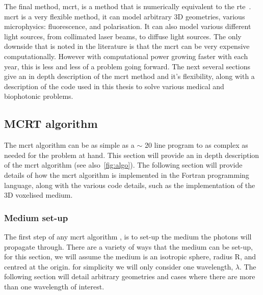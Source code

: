 \medskip

The final method, \gls{mcrt}, is a method that is numerically equivalent to the \gls{rte}~\cite{wang2012biomedical}. \Gls{mcrt} is a very flexible method, it can model arbitrary 3D geometries, various microphysics: fluorescence, and polarisation. It can also model various different light sources, from collimated laser beams, to diffuse light sources. The only downside that is noted in the literature is that the \gls{mcrt} can be very expensive computationally. However with computational power growing faster with each year, this is less and less of a problem going forward. The next several sections give an in depth description of the \gls{mcrt} method and it's flexibility, along with a description of the code used in this thesis to solve various medical and biophotonic problems.

\subsection{MCRT algorithm}

The \gls{mcrt} algorithm can be as simple as a $\sim$ 20 line program to as complex as needed for the problem at hand. This section will provide an in depth description of the \gls{mcrt} algorithm (see also~\cref{fig:algo}). The following section will provide details of how the \gls{mcrt} algorithm is implemented in the Fortran programming language, along with the various code details, such as the implementation of the 3D voxelised medium.



%
%
%
%
%

\subsubsection{Medium set-up}\label{sec:algomedium}
The first step of any \gls{mcrt} algorithm , is to set-up the medium the photons will propagate through. There are a variety of ways that the medium can be set-up, for this section, we will assume the medium is an isotropic sphere, radius R, and centred at the origin. for simplicity we will only consider one wavelength, $\lambda$. The following section will detail arbitrary geometries and cases where there are more than one wavelength of interest.




